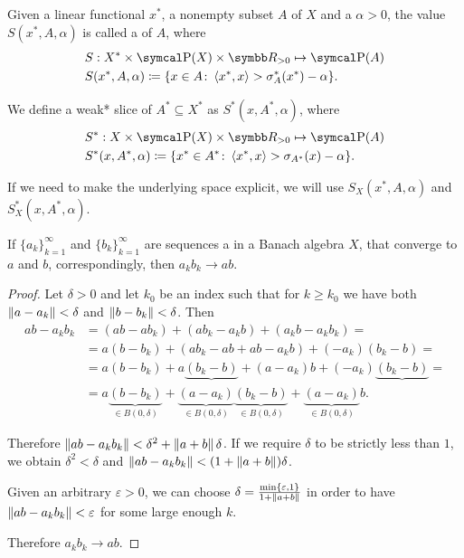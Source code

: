 \begin{definition}\label{def:banach_space_slice}\cite[definition 2.17]{Phelps1993}
  Given a linear functional \( x^* \), a nonempty subset \( A \) of \( X \) and a  \( \alpha > 0 \), the value \( S(x^*, A, \alpha) \) is called a  of \( A \), where
  \begin{align*}
    &S: X^* \times \Power(X) \times \R_{>0} \mapsto \Power(A) \\
    &S(x^*, A, \alpha) \coloneqq \{ x \in A \colon \Prod {x^*} x > \sigma_A^*(x^*) - \alpha \}.
  \end{align*}

  We define a weak* slice of \( A^* \subseteq X^* \) as \( S^*(x, A^*, \alpha) \), where
  \begin{align*}
    &S^*: X \times \Power(X) \times \R_{>0} \mapsto \Power(A) \\
    &S^*(x, A^*, \alpha) \coloneqq \{ x^* \in A^* \colon \Prod {x^*} x > \sigma_{A^*}(x) - \alpha \}.
  \end{align*}

  If we need to make the underlying space explicit, we will use \( S_X(x^*, A, \alpha) \) and \( S_X^*(x, A^*, \alpha) \).
\end{definition}

\begin{proposition}
  If \( \{ a_k \}_{k=1}^\infty \) and \( \{ b_k \}_{k=1}^\infty \) are sequences a in a Banach algebra \( X \), that converge to \( a \) and \( b \), correspondingly, then \( a_k b_k \to a b \).
\end{proposition}
\begin{proof}
  Let \( \delta > 0 \) and let \( k_0 \) be an index such that for \( k \geq k_0 \) we have both \( \left\Vert a - a_k \right\Vert < \delta \) and \( \left\Vert b - b_k \right\Vert < \delta \). Then
  \begin{align*}
    ab - a_k b_k
    &=
    (ab - a b_k) + (a b_k - a_k b) + (a_k b - a_k b_k)
    = \\ &=
    a (b - b_k) + (a b_k - ab + ab - a_k b) + (-a_k)(b_k - b)
    = \\ &=
    a (b - b_k) + a \underbrace{(b_k - b)} + (a - a_k) b + (-a_k)\underbrace{(b_k - b)}
    = \\ &=
    a \underbrace{(b - b_k)}_{\in B(0, \delta)} + \underbrace{(a - a_k)}_{\in B(0, \delta)} \underbrace{(b_k - b)}_{\in B(0, \delta)} + \underbrace{(a - a_k)}_{\in B(0, \delta)} b.
  \end{align*}

  Therefore \( \left\Vert ab - a_k b_k \right\Vert < \delta^2 + \left\Vert a + b \right\Vert \delta \). If we require \( \delta \) to be strictly less than \( 1 \), we obtain \( \delta^2 < \delta \) and \( \left\Vert ab - a_k b_k \right\Vert < (1 + \left\Vert a + b \right\Vert) \delta \).

  Given an arbitrary \( \varepsilon > 0 \), we can choose \( \delta = \tfrac {\min \{\varepsilon, 1 \}} {1 + \left\Vert a + b \right\Vert} \) in order to have \( \left\Vert ab - a_k b_k \right\Vert < \varepsilon \) for some large enough \( k \).

  Therefore \( a_k b_k \to a b \).
\end{proof}
